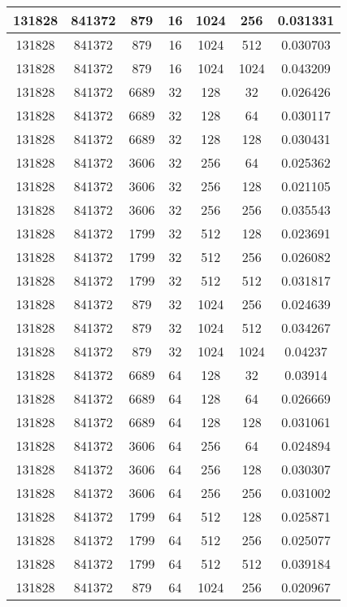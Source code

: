 \documentclass[9pt]{article}
\begin{document}
\begin{tabular}{|c|c|c|c|c|c|c| }
\hline
131828  & 841372  & 879  & 16  & 1024  & 256  & 0.031331 \\
\hline
131828  & 841372  & 879  & 16  & 1024  & 512  & 0.030703 \\
\hline
131828  & 841372  & 879  & 16  & 1024  & 1024  & 0.043209 \\
\hline
131828  & 841372  & 6689  & 32  & 128  & 32  & 0.026426 \\
\hline
131828  & 841372  & 6689  & 32  & 128  & 64  & 0.030117 \\
\hline
131828  & 841372  & 6689  & 32  & 128  & 128  & 0.030431 \\
\hline
131828  & 841372  & 3606  & 32  & 256  & 64  & 0.025362 \\
\hline
131828  & 841372  & 3606  & 32  & 256  & 128  & 0.021105 \\
\hline
131828  & 841372  & 3606  & 32  & 256  & 256  & 0.035543 \\
\hline
131828  & 841372  & 1799  & 32  & 512  & 128  & 0.023691 \\
\hline
131828  & 841372  & 1799  & 32  & 512  & 256  & 0.026082 \\
\hline
131828  & 841372  & 1799  & 32  & 512  & 512  & 0.031817 \\
\hline
131828  & 841372  & 879  & 32  & 1024  & 256  & 0.024639 \\
\hline
131828  & 841372  & 879  & 32  & 1024  & 512  & 0.034267 \\
\hline
131828  & 841372  & 879  & 32  & 1024  & 1024  & 0.04237 \\
\hline
131828  & 841372  & 6689  & 64  & 128  & 32  & 0.03914 \\
\hline
131828  & 841372  & 6689  & 64  & 128  & 64  & 0.026669 \\
\hline
131828  & 841372  & 6689  & 64  & 128  & 128  & 0.031061 \\
\hline
131828  & 841372  & 3606  & 64  & 256  & 64  & 0.024894 \\
\hline
131828  & 841372  & 3606  & 64  & 256  & 128  & 0.030307 \\
\hline
131828  & 841372  & 3606  & 64  & 256  & 256  & 0.031002 \\
\hline
131828  & 841372  & 1799  & 64  & 512  & 128  & 0.025871 \\
\hline
131828  & 841372  & 1799  & 64  & 512  & 256  & 0.025077 \\
\hline
131828  & 841372  & 1799  & 64  & 512  & 512  & 0.039184 \\
\hline
131828  & 841372  & 879  & 64  & 1024  & 256  & 0.020967 \\

\end{tabular}
\end{document}
